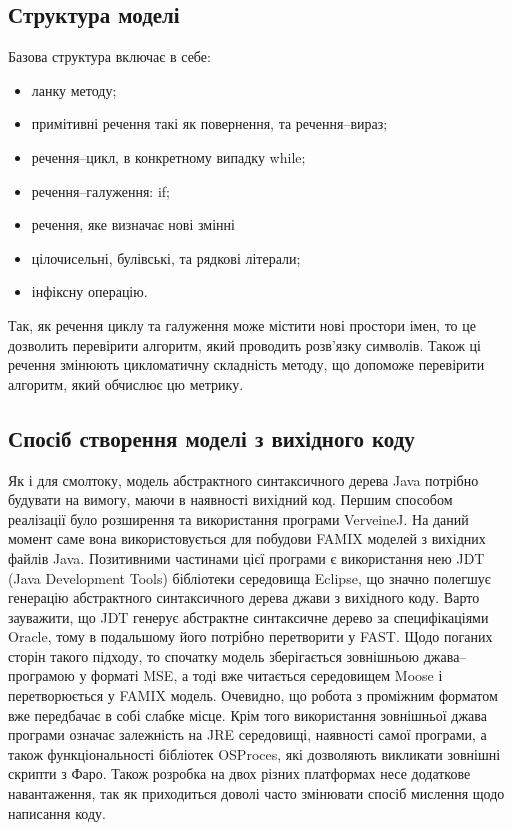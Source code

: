 \documentclass[12pt,a4paper]{article}
\begin{document}
\subsection{Структура моделі}
Базова структура включає в себе:
\begin{itemize}
  \item ланку методу;
  \item примітивні речення такі як повернення, та речення--вираз;
  \item речення--цикл, в конкретному випадку while;
  \item речення--галуження: if;
  \item речення, яке визначає нові змінні
  \item цілочисельні, булівські, та рядкові літерали;
  \item інфіксну операцію.
\end{itemize}

Так, як речення циклу та галуження може містити нові простори імен, то це дозволить перевірити алгоритм, який проводить розв'язку символів. Також ці речення змінюють цикломатичну складність методу, що допоможе перевірити алгоритм, який обчислює цю метрику. 

\subsection{Спосіб створення моделі з вихідного коду}
Як і для смолтоку, модель абстрактного синтаксичного дерева Java потрібно будувати на вимогу, маючи в наявності вихідний код. Першим способом реалізації було розширення та використання програми VerveineJ. На даний момент саме вона використовується для побудови FAMIX моделей з вихідних файлів Java. Позитивними частинами цієї програми є використання нею JDT (Java Development Tools) бібліотеки середовища Eclipse, що значно полегшує генерацію абстрактного синтаксичного дерева джави з вихідного коду. Варто зауважити, що JDT генерує абстрактне синтаксичне дерево за специфікаціями Oracle, тому в подальшому його потрібно перетворити у FAST. Щодо поганих сторін такого підходу, то спочатку модель зберігається зовнішньою джава--програмою у форматі MSE, а тоді вже читається середовищем Moose і перетворюється у FAMIX модель. Очевидно, що робота з проміжним форматом вже передбачає в собі слабке місце. Крім того використання зовнішньої джава програми означає залежність на JRE середовищі, наявності самої програми, а також функціональності бібліотек OSProces, які дозволяють викликати зовнішні скрипти з Фаро. Також розробка на двох різних платформах несе додаткове навантаження, так як приходиться доволі часто змінювати спосіб мислення щодо написання коду.
\end{document}
